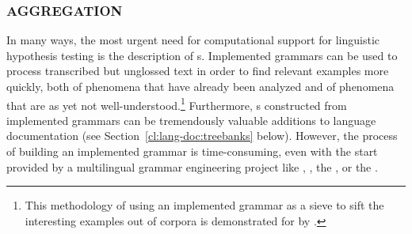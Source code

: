 \documentclass[output=paper
	        ,collection
	        ,collectionchapter
 	        ,biblatex
                ,babelshorthands
                ,newtxmath
                ,draftmode
                ,colorlinks, citecolor=brown
]{langscibook}
\begin{document}
\subsubsection{AGGREGATION}
\label{cl:lang-doc:aggr}


In many ways, the most urgent need for computational support for
linguistic hypothesis testing is the description of s. Implemented grammars can be used to process transcribed but
unglossed text in order to find relevant examples more quickly, both
of phenomena that have already been analyzed and of phenomena that are
as yet not well-understood.\footnote{This methodology of using an
  implemented grammar as a sieve to sift the interesting examples out
  of corpora is demonstrated for  by \cite{Baldwin-et-al-05}.}
Furthermore, s constructed from implemented grammars can be
tremendously valuable additions to language documentation (see
Section~\ref{cl:lang-doc:treebanks} below). However, the process of building an
implemented grammar is time-consuming, even with the start provided by
a multilingual grammar engineering project like ,  \citep{BDKMR02a-u,Kin:For:Kuh:But:05}, the  \citep{Ranta:09}, or the
.
\end{document}
